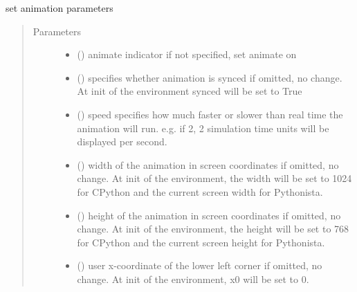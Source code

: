 \documentclass[letterpaper,10pt,english]{sphinxmanual}
\begin{document}
\begin{fulllineitems}
\begin{fulllineitems}
\label{\detokenize{Reference:salabim.Environment.animation_parameters}}
set animation parameters
\begin{quote}\begin{description}
\item[{Parameters}] \leavevmode\begin{itemize}
\item {} 
 () \textendash{} animate indicator 
if not specified, set animate on 

\item {} 
 () \textendash{} specifies whether animation is synced 
if omitted, no change. At init of the environment synced will be set to True

\item {} 
 () \textendash{} speed 
specifies how much faster or slower than real time the animation will run.
e.g. if 2, 2 simulation time units will be displayed per second.

\item {} 
 () \textendash{} width of the animation in screen coordinates 
if omitted, no change. At init of the environment, the width will be
set to 1024 for CPython and the current screen width for Pythonista.

\item {} 
 () \textendash{} height of the animation in screen coordinates 
if omitted, no change. At init of the environment, the height will be
set to 768 for CPython and the current screen height for Pythonista.

\item {} 
 () \textendash{} user x-coordinate of the lower left corner 
if omitted, no change. At init of the environment, x0 will be set to 0.


\end{itemize}
\end{description}
\end{quote}
\end{fulllineitems}
\end{fulllineitems}
\end{document}
